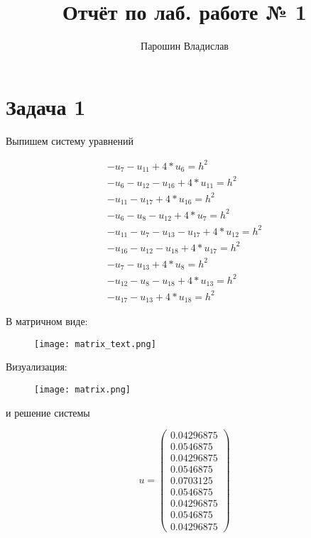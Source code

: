 \documentclass{llncs}
\title{Отчёт по лаб. работе № 1}
\author{
Парошин Владислав
}
\begin{document}
\maketitle

\section{ Задача 1}

	Выпишем систему уравнений

\begin{align*}
-u_7 -u_{11} + 4*u_6 = h^2 \\
-u_6 -u_{12} -u_{16} + 4*u_{11} = h^2 \\
-u_{11} -u_{17} + 4*u_{16} = h^2 \\
-u_6 -u_8 -u_{12} + 4*u_7 = h^2 \\
-u_{11} -u_7 -u_{13} -u_{17} + 4*u_{12} = h^2 \\
-u_{16} -u_{12} -u_{18} + 4*u_{17} = h^2 \\
-u_7 -u_{13} + 4*u_8 = h^2 \\
-u_{12} -u_8 -u_{18} + 4*u_{13} = h^2 \\
-u_{17} -u_{13} + 4*u_{18} = h^2
\end{align*}

В матричном виде:

\begin{figure}[]
	\centering
	\texttt{[image: matrix\_text.png]}
\end{figure}


Визуализация:


\begin{figure}[]
	\centering
	\texttt{[image: matrix.png]}
\end{figure}

и решение системы

\[
  u = 
  \begin{pmatrix}
    0.04296875 \\
    0.0546875  \\
    0.04296875 \\
    0.0546875  \\
    0.0703125  \\
    0.0546875  \\
    0.04296875 \\
    0.0546875  \\
    0.04296875
  \end{pmatrix}
\]
\end{document}
